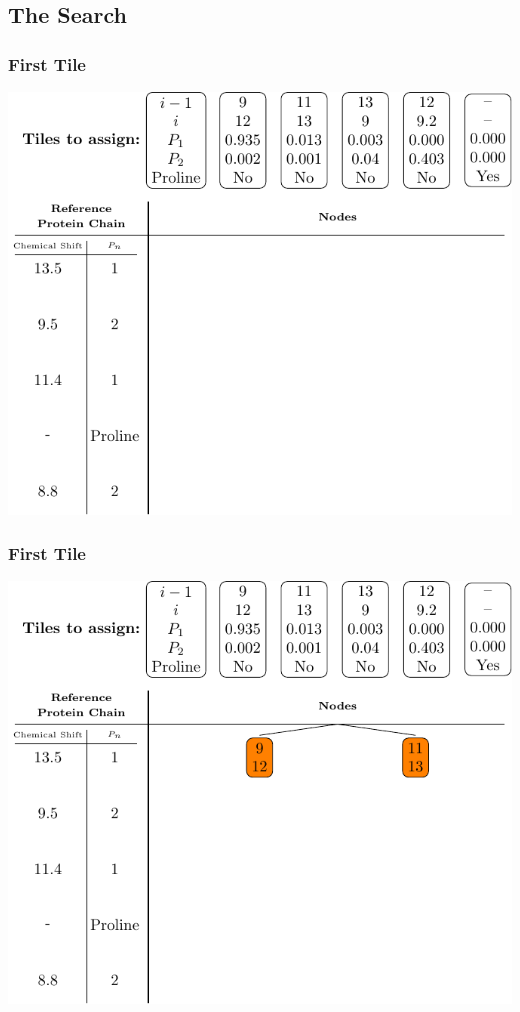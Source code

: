 \documentclass{beamer}
\begin{document}
\subsection{The Search} 
\begin{frame}
	\frametitle{First Tile}
	\vspace{-.5cm}
	\center
	\includegraphics[width=.9\textwidth]{tilePlacement/step1}
\end{frame}


\begin{frame}
	\frametitle{First Tile}
	\vspace{-.5cm}
	\center
	\includegraphics[width=.9\textwidth]{tilePlacement/step2}
\end{frame}
\end{document}
